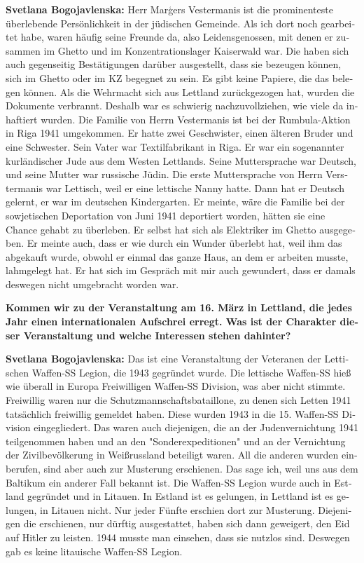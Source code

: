 \begin{otherlanguage}{ngerman}
\textbf{Svetlana Bogojavlenska:} Herr Marģers Vestermanis ist die prominenteste überlebende Persönlichkeit in der jüdischen Gemeinde. Als ich dort noch gearbeitet habe, waren häufig seine Freunde da, also Leidensgenossen, mit denen er zusammen im Ghetto und im Konzentrationslager Kaiserwald war. Die haben sich auch gegenseitig Bestätigungen darüber ausgestellt, dass sie bezeugen können, sich im Ghetto oder im KZ begegnet zu sein. Es gibt keine Papiere, die das belegen können. Als die Wehrmacht sich aus Lettland zurückgezogen hat, wurden die Dokumente verbrannt. Deshalb war es schwierig nachzuvollziehen, wie viele da inhaftiert wurden. Die Familie von Herrn Vestermanis ist bei der Rumbula-Aktion in Riga 1941 umgekommen. Er hatte zwei Geschwister, einen älteren Bruder und eine Schwester. Sein Vater war Textilfabrikant in Riga. Er war ein sogenannter kurländischer Jude aus dem Westen Lettlands. Seine Muttersprache war Deutsch, und seine Mutter war russische Jüdin. Die erste Muttersprache von Herrn Verstermanis war Lettisch, weil er eine lettische Nanny hatte. Dann hat er Deutsch gelernt, er war im deutschen Kindergarten. Er meinte, wäre die Familie bei der sowjetischen Deportation von Juni 1941 deportiert worden, hätten sie eine Chance gehabt zu überleben. Er selbst hat sich als Elektriker im Ghetto ausgegeben. Er meinte auch, dass er wie durch ein Wunder überlebt hat, weil ihm das abgekauft wurde, obwohl er einmal das ganze Haus, an dem er arbeiten musste, lahmgelegt hat. Er hat sich im Gespräch mit mir auch gewundert, dass er damals deswegen nicht umgebracht worden war.

\textbf{Kommen wir zu der Veranstaltung am 16. März in Lettland, die jedes Jahr einen internationalen Aufschrei erregt. Was ist der Charakter dieser Veranstaltung und welche Interessen stehen dahinter?}

\textbf{Svetlana Bogojavlenska:} Das ist eine Veranstaltung der Veteranen der Lettischen Waffen-SS Legion, die 1943 gegründet wurde. Die lettische Waffen-SS hieß wie überall in Europa Freiwilligen Waffen-SS Division, was aber nicht stimmte. Freiwillig waren nur die Schutzmannschaftsbataillone, zu denen sich Letten 1941 tatsächlich freiwillig gemeldet haben. Diese wurden 1943 in die 15. Waffen-SS Division eingegliedert. Das waren auch diejenigen, die an der Judenvernichtung 1941 teilgenommen haben und an den "Sonderexpeditionen" und an der Vernichtung der Zivilbevölkerung in Weißrussland beteiligt waren. All die anderen wurden einberufen, sind aber auch zur Musterung erschienen. Das sage ich, weil uns aus dem Baltikum ein anderer Fall bekannt ist. Die Waffen-SS Legion wurde auch in Estland gegründet und in Litauen. In Estland ist es gelungen, in Lettland ist es gelungen, in Litauen nicht. Nur jeder Fünfte erschien dort zur Musterung. Diejenigen die erschienen, nur dürftig ausgestattet, haben sich dann geweigert, den Eid auf Hitler zu leisten. 1944 musste man einsehen, dass sie nutzlos sind. Deswegen gab es keine litauische Waffen-SS Legion. 


\end{otherlanguage}

